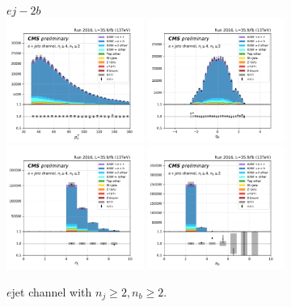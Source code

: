 \begin{figure}[ht]
    \centering
    $e j - 2b$ \\
    \includegraphics[width=0.4\textwidth]{chapters/Analysis/sectionPlots/figures/kinematics_pickles/e4j/2b/e4j_2b_lepton1_pt.pdf}
    \includegraphics[width=0.4\textwidth]{chapters/Analysis/sectionPlots/figures/kinematics_pickles/e4j/2b/e4j_2b_lepton1_eta.pdf}
    \includegraphics[width=0.4\textwidth]{chapters/Analysis/sectionPlots/figures/kinematics_pickles/e4j/2b/e4j_2b_nJets.pdf}
    \includegraphics[width=0.4\textwidth]{chapters/Analysis/sectionPlots/figures/kinematics_pickles/e4j/2b/e4j_2b_nBJets.pdf}
    
    \caption{$e$jet channel with $n_j\geq2, n_b\geq2$.}
\end{figure}
